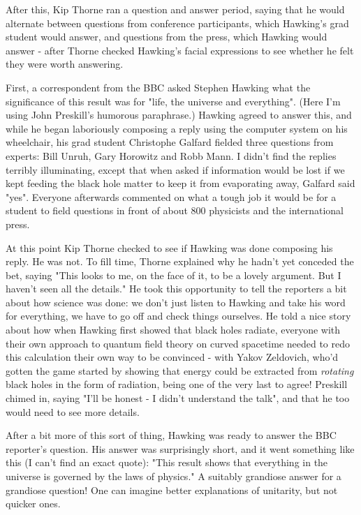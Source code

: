 After this, Kip Thorne ran a question and answer period, saying that
he would alternate between questions from conference participants,
which Hawking's grad student would answer, and questions from the 
press, which Hawking would answer - after Thorne checked Hawking's 
facial expressions to see whether he felt they were worth answering.  

First, a correspondent from the BBC asked Stephen Hawking what the 
significance of this result was for "life, the universe and 
everything".
(Here I'm using John Preskill's humorous paraphrase.)  Hawking agreed
to answer this, and while he began laboriously composing a reply using 
the computer system on his wheelchair, his grad student Christophe 
Galfard fielded three questions from experts: Bill Unruh, Gary Horowitz 
and Robb Mann.  I didn't find the replies terribly illuminating, except 
that when asked if information would be lost if we kept feeding the black 
hole matter to keep it from evaporating away, Galfard said "yes".  
Everyone
afterwards commented on what a tough job it would be for a student to 
field questions in front of about 800 physicists and the international 
press.  

At this point Kip Thorne checked to see if Hawking was done composing
his reply.   He was not.  To fill time, Thorne explained why he hadn't
yet conceded the bet, saying "This looks to me, on the face of it, to
be a lovely argument.  But I haven't seen all the details."  He took
this opportunity to tell the reporters a bit about how science was done:
we don't just listen to Hawking and take his word for everything, we have
to go off and check things ourselves. 
He told a nice story about how when Hawking first showed
that black holes radiate, everyone with their own approach to quantum
field theory on curved spacetime needed to redo this calculation their
own way to be convinced - with Yakov Zeldovich, who'd gotten the game
started by showing that energy could be extracted from \emph{rotating} black
holes in the form of radiation, being one of the very last to agree!
Preskill chimed in, saying "I'll be honest - I didn't understand the
talk", and that he too would need to see more details.  

After a bit more of this sort of thing, Hawking was ready to answer
the BBC reporter's question.  His answer was surprisingly short, and it
went something like this (I can't find an exact quote): "This result
shows that everything in the universe is governed by the laws of 
physics."  A suitably grandiose answer for a grandiose question!
One can imagine better explanations of unitarity, but not quicker ones.

